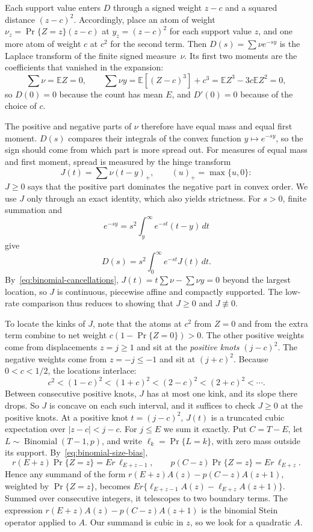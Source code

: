 \documentclass[11pt]{article}
\theoremstyle{remark}
\newcommand{\E}{\mathbb E}
\begin{document}
Each support value enters $D$ through a signed weight $z-c$ and a squared
distance $(z-c)^2$. Accordingly, place an atom of weight
$\nu_z=\Pr\{Z=z\}(z-c)$ at $y_z=(z-c)^2$ for each support value $z$, and one
more atom of weight $c$ at $c^2$ for the second term. Then
$D(s)=\sum\nu e^{-sy}$ is the Laplace transform of the finite signed
measure~$\nu$. Its first two moments are the coefficients that vanished in the
expansion:
\begin{equation}\label{eq:binomial-cancellations}
 \sum\nu=\E Z=0,\qquad
 \sum\nu y=\E[(Z-c)^3]+c^3=\E Z^3-3c\E Z^2=0,
\end{equation}
so $D(0)=0$ because the count has mean $E$, and $D'(0)=0$ because of the
choice of $c$.

The positive and negative parts of $\nu$ therefore have equal mass and equal
first moment. $D(s)$ compares their integrals of the convex function
$y\mapsto e^{-sy}$, so the sign should come from which part is more spread
out. For measures of equal mass and first moment, spread is measured by the
hinge transform
\begin{equation}\label{eq:binomial-double-cumulative}
 J(t)=\sum\nu(t-y)_+,\qquad (u)_+=\max\{u,0\}:
\end{equation}
$J\geq0$ says that the positive part dominates the negative part in convex
order. We use $J$ only through an exact identity, which also yields
strictness. For $s>0$, finite summation and
\[
 e^{-sy}=s^2\int_y^\infty e^{-st}(t-y)\,dt
\]
give
\begin{equation}\label{eq:binomial-laplace-hinge}
 D(s)=s^2\int_0^\infty e^{-st}J(t)\,dt.
\end{equation}
By~\eqref{eq:binomial-cancellations}, $J(t)=t\sum\nu-\sum\nu y=0$ beyond
the largest location, so $J$ is continuous, piecewise affine and compactly
supported. The low-rate comparison thus reduces to showing that $J\geq0$
and $J\not\equiv0$.

To locate the kinks of $J$, note that the atoms at $c^2$ from $Z=0$ and from
the extra term combine to net weight $c(1-\Pr\{Z=0\})>0$. The other positive
weights come from displacements $z=j\geq1$ and sit at the \emph{positive
knots} $(j-c)^2$. The negative weights come from $z=-j\leq-1$ and sit at
$(j+c)^2$. Because $0<c<1/2$, the locations interlace:
\[
 c^2<(1-c)^2<(1+c)^2<(2-c)^2<(2+c)^2<\cdots.
\]
Between consecutive positive knots, $J$ has at most one kink, and its slope
there drops. So $J$ is concave on each such interval, and it suffices to check
$J\geq0$ at the positive knots. At a positive knot $t=(j-c)^2$, $J(t)$ is a
truncated cubic expectation over $|z-c|<j-c$. For $j\leq E$ we sum it
exactly. Put $C=T-E$, let $L\sim\operatorname{Binomial}(T-1,p)$, and write
$\ell_k=\Pr\{L=k\}$, with zero mass outside its support.
By~\eqref{eq:binomial-size-bias},
\[
 r(E+z)\Pr\{Z=z\}=Er\,\ell_{E+z-1},\qquad
 p(C-z)\Pr\{Z=z\}=Er\,\ell_{E+z}.
\]
Hence any summand of the form $r(E+z)A(z)-p(C-z)A(z+1)$, weighted by
$\Pr\{Z=z\}$, becomes $Er\{\ell_{E+z-1}A(z)-\ell_{E+z}A(z+1)\}$. Summed over
consecutive integers, it telescopes to two boundary terms. The expression
$r(E+z)A(z)-p(C-z)A(z+1)$ is the binomial Stein operator applied to $A$.
Our summand is cubic in $z$, so we look for a quadratic $A$.
\end{document}

